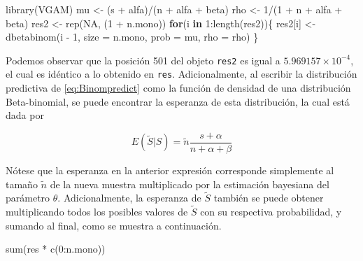 \documentclass[
  10pt,
  spanish,
]{book}
\newenvironment{Shaded}{\begin{snugshade}}{\end{snugshade}}
\newcommand{\AttributeTok}[1]{\textcolor[rgb]{0.77,0.63,0.00}{#1}}
\newcommand{\ConstantTok}[1]{\textcolor[rgb]{0.00,0.00,0.00}{#1}}
\newcommand{\ControlFlowTok}[1]{\textcolor[rgb]{0.13,0.29,0.53}{\textbf{#1}}}
\newcommand{\DecValTok}[1]{\textcolor[rgb]{0.00,0.00,0.81}{#1}}
\newcommand{\FunctionTok}[1]{\textcolor[rgb]{0.00,0.00,0.00}{#1}}
\newcommand{\NormalTok}[1]{#1}
\newcommand{\OtherTok}[1]{\textcolor[rgb]{0.56,0.35,0.01}{#1}}
\newcommand{\SpecialCharTok}[1]{\textcolor[rgb]{0.00,0.00,0.00}{#1}}
\theoremstyle{definition}
\theoremstyle{definition}
\theoremstyle{definition}
\theoremstyle{definition}
\theoremstyle{remark}
\begin{document}
\begin{Shaded}
\begin{Highlighting}[]
\FunctionTok{library}\NormalTok{(VGAM) }
\NormalTok{mu }\OtherTok{\textless{}{-}}\NormalTok{ (s }\SpecialCharTok{+}\NormalTok{ alfa)}\SpecialCharTok{/}\NormalTok{(n }\SpecialCharTok{+}\NormalTok{ alfa }\SpecialCharTok{+}\NormalTok{ beta)}
\NormalTok{rho }\OtherTok{\textless{}{-}} \DecValTok{1}\SpecialCharTok{/}\NormalTok{(}\DecValTok{1} \SpecialCharTok{+}\NormalTok{ n }\SpecialCharTok{+}\NormalTok{ alfa }\SpecialCharTok{+}\NormalTok{ beta) }
\NormalTok{res2 }\OtherTok{\textless{}{-}} \FunctionTok{rep}\NormalTok{(}\ConstantTok{NA}\NormalTok{, (}\DecValTok{1} \SpecialCharTok{+}\NormalTok{ n.mono)) }
\ControlFlowTok{for}\NormalTok{(i }\ControlFlowTok{in} \DecValTok{1}\SpecialCharTok{:}\FunctionTok{length}\NormalTok{(res2))\{}
\NormalTok{  res2[i] }\OtherTok{\textless{}{-}} \FunctionTok{dbetabinom}\NormalTok{(i }\SpecialCharTok{{-}} \DecValTok{1}\NormalTok{,}
                        \AttributeTok{size =}\NormalTok{ n.mono,}
                        \AttributeTok{prob =}\NormalTok{ mu,}
                        \AttributeTok{rho =}\NormalTok{ rho)}
\NormalTok{\}}
\end{Highlighting}
\end{Shaded}

Podemos observar que la posición 501 del objeto \texttt{res2} es igual a \ensuremath{5.969157\times 10^{-4}}, el cual es idéntico a lo obtenido en \texttt{res}. Adicionalmente, al escribir la distribución predictiva de
\eqref{eq:Binompredict} como la función de densidad de una distribución
Beta-binomial, se puede encontrar la esperanza de esta distribución, la
cual está dada por

\begin{equation*}
E(\tilde{S}|S)=\tilde{n}\frac{s+\alpha}{n+\alpha+\beta}
\end{equation*}

Nótese que la esperanza en la anterior expresión corresponde simplemente
al tamaño \(\tilde{n}\) de la nueva muestra multiplicado por la
estimación bayesiana del parámetro \(\theta\). Adicionalmente, la
esperanza de \(\tilde{S}\) también se puede obtener multiplicando todos los
posibles valores de \(\tilde{S}\) con su respectiva probabilidad, y sumando
al final, como se muestra a continuación.

\begin{Shaded}
\begin{Highlighting}[]
\FunctionTok{sum}\NormalTok{(res }\SpecialCharTok{*} \FunctionTok{c}\NormalTok{(}\DecValTok{0}\SpecialCharTok{:}\NormalTok{n.mono)) }
\end{Highlighting}
\end{Shaded}
\end{document}
